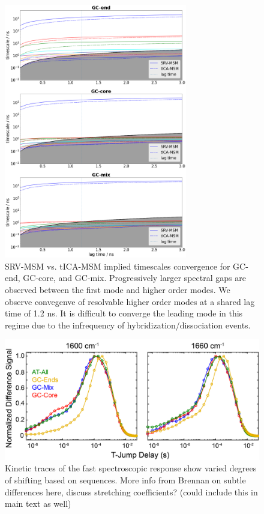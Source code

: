 \documentclass[journal=jpcbfk,manuscript=article]{achemso}
\begin{document}
\begin{figure}[ht!]
	\begin{center}
        \includegraphics[width=80mm, 
        scale=0.5]{Figs/figs_imp/all_seq_implied_times.png}
        \caption{SRV-MSM vs. tICA-MSM implied timescales convergence for GC-end, GC-core, and GC-mix. Progressively larger spectral gaps are observed between the first mode and higher order modes. We observe convegenve of resolvable higher order modes at a shared lag time of 1.2 ns. It is difficult to converge the leading mode in this regime due to the infrequency of hybridization/dissociation events.}
        \label{fig:all_seq_lags}
	\end{center}
\end{figure}

\begin{figure}[ht!]
	\begin{center}
        \includegraphics[width=120mm, 
        scale=0.5]{Figs/figs_imp/GCSeq_TJTraces.png}
        \caption{Kinetic traces of the fast spectroscopic response show varied degrees of shifting based on sequences. More info from Brennan on subtle differences here, discuss stretching coefficients? (could include this in main text as well)}
        \label{fig:fast_stretching}
	\end{center}
\end{figure}
\end{document}
